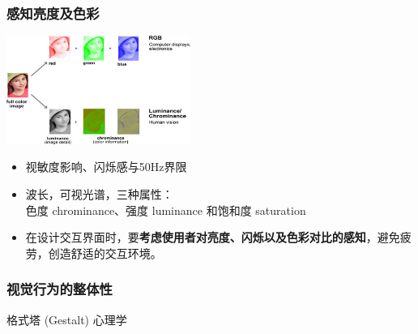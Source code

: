 \documentclass{beamer}
\begin{document}
\begin{frame}
	\frametitle{感知亮度及色彩}
	\beamertemplatetransparentcovereddynamicmedium
	\begin{center}
		\includegraphics[width=6cm]{images/04_rgb_luminance.jpg}
	\end{center}
	\begin{itemize}[<+->]
		\item 视敏度影响、闪烁感与50Hz界限
		\item 波长，可视光谱，三种属性：\\{\tiny 色度 chrominance、强度 luminance 和饱和度 saturation}
		\item 在设计交互界面时，要\textbf{考虑使用者对亮度、闪烁以及色彩对比的感知}，避免疲劳，创造舒适的交互环境。
	\end{itemize}
\end{frame}

\begin{frame}
	\frametitle{视觉行为的整体性}
	格式塔 (Gestalt) 心理学\\
	\begin{center}
	\end{center}
\end{frame}
\end{document}
